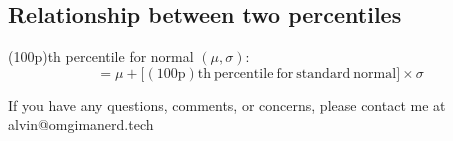 \documentclass[letterpaper, 12pt]{math}
\begin{document}
\subsection*{Relationship between two percentiles}
(100p)th percentile for normal \( (\mu,\sigma) \):
\[ = \mu +\big[\mathrm{(100p)th\ percentile\ for\ standard\ normal}\big]
   \times\sigma \]

\begin{center}
  If you have any questions, comments, or concerns, please contact me at
  alvin@omgimanerd.tech
\end{center}
\end{document}
